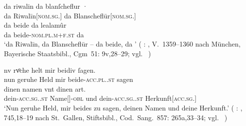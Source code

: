 \begin{exe}
\ex \label{ex:askedal73pr}
	\begin{xlist}
	\ex \label{ex:askedal73pr_1}
		\gll da riwalin da {blanſcheflur ·} \\
			da Riwalīn[\textsc{nom.sg.\MascM}] da
				Blanscheflūr[\textsc{nom.sg.\FemF}] \\
		\gll da beide da lealamûr \\
			da beide-\textsc{nom.pl.m+f\subMF.st} da  \\
		\trans `da Riwalīn, da Blanscheflūr -- da beide, da '
			(%
				: , V.~1359--1360
				nach München, Bayerische Staatsbibl., Cgm~51: 9v,28--29;
				vgl.~\cite[22]{maroldschroeder1969}%
			)

	\ex \label{ex:askedal73pr_2}
		\gll nv rvͦche helt mir beidiv ſagen. \\
			nun geruhe Held mir beide-\textsc{acc.pl.\NeutI.st} sagen \\
		\gll dinen namen vnt dinen art. \\
			dein-\textsc{acc.sg.\MascI.st} Name[\textsc{\MascI}]-\textsc{obl}
			und dein-\textsc{acc.sg.\MascI.st}
			Herkunft[\textsc{acc.sg.\MascI}] \\
		\trans `Nun geruhe Held, mir beides zu sagen, deinen Namen und
			deine Herkunft.'\footnotemark{}
			(%
				: , 745,18--19
				nach St.~Gallen, Stiftsbibl., Cod.~Sang.~857: 265a,33--34;
				vgl.~\cite[749]{knechtschirok2003}%
			)
	\end{xlist}
\end{exe}
%

